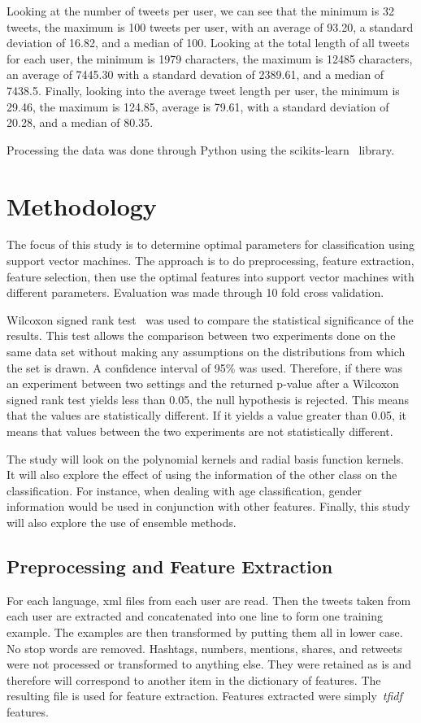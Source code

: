 \documentclass[a4paper]{llncs}
\begin{document}
Looking at the number of tweets per user, we can see that the minimum is 32 tweets, the maximum is 100 tweets per user, with an average of 93.20, a standard deviation of 16.82, and a median of 100. Looking at the total length of  all tweets for each user, the minimum is 1979 characters, the maximum is 12485 characters, an average of 7445.30 with a standard devation of 2389.61, and a median of 7438.5. Finally, looking into the average tweet length per user, the minimum is 29.46, the maximum is 124.85, average is 79.61, with a standard deviation of 20.28, and a median of 80.35.   




Processing the data was done through Python using the scikits-learn~\cite{scikit-learn} library. 

\section{Methodology}
The focus of this study is to determine optimal parameters for classification using support vector machines. The approach is to do preprocessing, feature extraction, feature selection, then use the optimal features into support vector machines with different parameters. Evaluation was made through 10 fold cross validation.

Wilcoxon signed rank test~\cite{wilcoxon1945individual} was used to compare the statistical significance of the results. This test allows the comparison between two experiments done on the same data set without making any assumptions on the distributions from which the set is drawn. A confidence interval of 95\% was used. Therefore, if there was an experiment between two settings and the returned p-value after a Wilcoxon signed rank test yields less than 0.05, the null hypothesis is rejected. This means that the values are statistically different. If it yields a value greater than 0.05, it means that values between the two experiments are not statistically different. 

The study will look on the polynomial kernels and radial basis function kernels. It will also explore the effect of using the information of the other class on the classification. For instance, when dealing with age classification, gender information would be used in conjunction with other features. Finally, this study will also explore the use of ensemble methods. 

\subsection{Preprocessing and Feature Extraction}
For each language, xml files from each user are read. Then the tweets taken from each user are extracted and concatenated into one line to form one training example. The examples are then transformed by putting them all in lower case. No stop words are removed. Hashtags, numbers, mentions, shares, and retweets were not processed or transformed to anything else. They were retained as is and therefore will correspond to another item in the dictionary of features. The resulting file is used for feature extraction.  Features extracted were simply~\textit{tfidf} features.  
\end{document}
